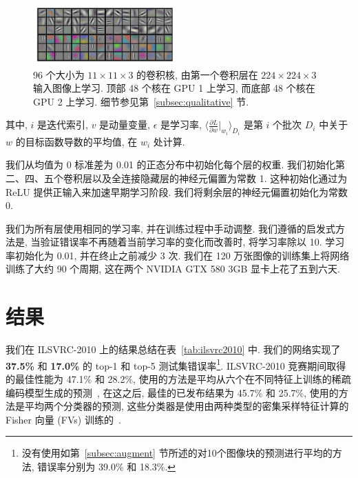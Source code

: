 \documentclass{article} %
\begin{document}
\begin{figure}
\centering
\includegraphics[width=0.49\textwidth]{kernels.png}

\caption{96 个大小为 $11 \times 11 \times 3$ 的卷积核, 由第一个卷积层在 $224 \times 224 \times 3$ 输入图像上学习. 顶部 48 个核在 GPU 1 上学习, 而底部 48 个核在 GPU 2 上学习. 细节参见第~\ref{subsec:qualitative} 节.}
\label{fig:kernels}
\end{figure}

其中, $i$ 是迭代索引, $v$ 是动量变量, $\epsilon$ 是学习率, $\langle  \frac{\partial L}{\partial w}|_{w_i} \rangle_{D_i}$ 是第 $i$ 个批次 $D_i$ 中关于 $w$ 的目标函数导数的平均值, 在 $w_i$ 处计算.

我们从均值为 0  标准差为 0.01 的正态分布中初始化每个层的权重. 我们初始化第二、四、五个卷积层以及全连接隐藏层的神经元偏置为常数 1. 这种初始化通过为 ReLU 提供正输入来加速早期学习阶段. 我们将剩余层的神经元偏置初始化为常数 0.

我们为所有层使用相同的学习率, 并在训练过程中手动调整. 我们遵循的启发式方法是, 当验证错误率不再随着当前学习率的变化而改善时, 将学习率除以 10. 学习率初始化为 0.01, 并在终止之前减少 3 次. 我们在 120 万张图像的训练集上将网络训练了大约 90 个周期, 这在两个 NVIDIA GTX 580 3GB 显卡上花了五到六天.

\vspace{-1mm}
\section{结果}
\label{sec:result}
\vspace{-2ex}
我们在 ILSVRC-2010 上的结果总结在表~\ref{tab:ilsvrc2010} 中. 我们的网络实现了 \textbf{37.5\%} 和 \textbf{17.0\%} 的 top-1 和 top-5 测试集错误率\footnote{没有使用如第~\ref{subsec:augment} 节所述的对10个图像块的预测进行平均的方法, 错误率分别为 39.0\% 和 18.3\%.}. ILSVRC-2010 竞赛期间取得的最佳性能为 47.1\% 和 28.2\%, 使用的方法是平均从六个在不同特征上训练的稀疏编码模型生成的预测~\cite{berg2010}, 在这之后, 最佳的已发布结果为 45.7\% 和 25.7\%, 使用的方法是平均两个分类器的预测, 这些分类器是使用由两种类型的密集采样特征计算的 Fisher 向量 (FVs) 训练的~\cite{sanchez2011}.
\end{document}
